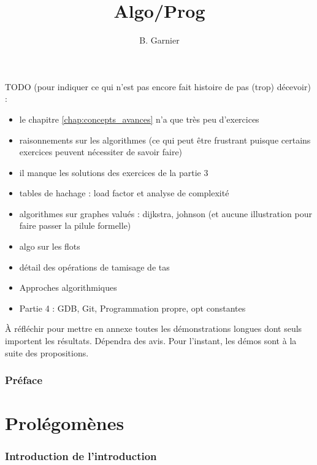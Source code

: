 \documentclass{minitelreport}
\begin{document}
	\title{Algo/Prog}
	\author{
		B. Garnier
	}
	\maketitle
\begin{refsection} %
TODO (pour indiquer ce qui n'est pas encore fait histoire de pas (trop) décevoir) :
\begin{itemize}
	\item le chapitre \ref{chap:concepts_avances} n'a que très peu d'exercices
	\item raisonnements sur les algorithmes (ce qui peut être frustrant puisque certains exercices peuvent nécessiter de savoir faire)
	\item il manque les solutions des exercices de la partie 3
	\item tables de hachage : load factor et analyse de complexité 
	\item algorithmes sur graphes valués : dijkstra, johnson (et aucune illustration pour faire passer la pilule formelle)
	\item algo sur les flots
	\item détail des opérations de tamisage de tas
	\item Approches algorithmiques
	\item Partie 4 : GDB, Git, Programmation propre, opt constantes
\end{itemize}
À réfléchir pour mettre en annexe toutes les démonstrations longues dont seuls importent les résultats. Dépendra des avis. Pour l'instant, les démos sont à la suite des propositions.
\section*{Préface}

\tableofcontents
\listofdefinition
\listoftables
\newpage
\part{Prolégomènes}
\label{part:prol_gom_nes}
	\section*{Introduction de l'introduction}
	

\end{refsection}
\end{document}

